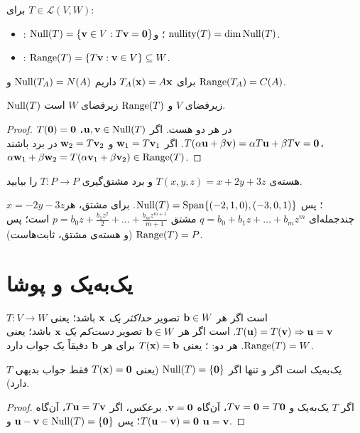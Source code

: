 \begin{definition}
برای $T\in\mathcal{L}(V,W)$:
\begin{itemize}
  \item {}: $\operatorname{Null}(T)=\{\mathbf{v}\in V: T\mathbf{v}=\mathbf{0}\}$؛ و $\operatorname{nullity}(T)=\dim\operatorname{Null}(T)$.
  \item {}: $\operatorname{Range}(T)=\{T\mathbf{v}:\mathbf{v}\in V\}\subseteq W$.
\end{itemize} برای $T_A(\mathbf{x})=A\mathbf{x}$ داریم $\operatorname{Null}(T_A)=N(A)$ و $\operatorname{Range}(T_A)=C(A)$.
\end{definition}

\begin{theorem}\label{thm:null-range-subspace}
$\operatorname{Null}(T)$ زیرفضای $V$ و $\operatorname{Range}(T)$ زیرفضای $W$ است.
\end{theorem}
\begin{proof}
$T(\mathbf{0})=\mathbf{0}$ در هر دو هست. اگر $\mathbf{u},\mathbf{v}\in\operatorname{Null}(T)$، $T(\alpha\mathbf{u}+\beta\mathbf{v})=\alpha T\mathbf{u}+\beta T\mathbf{v}=\mathbf{0}$. اگر $\mathbf{w}_1=T\mathbf{v}_1$ و $\mathbf{w}_2=T\mathbf{v}_2$ در برد باشند، $\alpha\mathbf{w}_1+\beta\mathbf{w}_2=T(\alpha\mathbf{v}_1+\beta\mathbf{v}_2)\in\operatorname{Range}(T)$.
\end{proof}

\begin{example}
هسته‌ی $T(x,y,z)=x+2y+3z$ و برد مشتق‌گیری $T:P\to P$ را بیابید.
\end{example}
\begin{solution}
$x=-2y-3z$؛ پس $\operatorname{Null}(T)=\operatorname{Span}\{(-2,1,0),(-3,0,1)\}$. برای مشتق، هر چندجمله‌ای $q=b_0+b_1z+\dots+b_mz^m$ مشتق $p=b_0z+\frac{b_1z^2}2+\dots+\frac{b_mz^{m+1}}{m+1}$ است؛ پس $\operatorname{Range}(T)=P$ (و هسته‌ی مشتق، ثابت‌هاست).
\end{solution}

\section{یک‌به‌یک و پوشا}

\begin{definition}[یک‌به‌یک و پوشا]
$T:V\to W$  است اگر هر $\mathbf{b}\in W$ تصویر \emph{حداکثر یک} $\mathbf{x}$ باشد؛ یعنی $T(\mathbf{u})=T(\mathbf{v})\Rightarrow\mathbf{u}=\mathbf{v}$.  است اگر هر $\mathbf{b}\in W$ تصویر \emph{دست‌کم یک} $\mathbf{x}$ باشد؛ یعنی $\operatorname{Range}(T)=W$. هر دو: ؛ یعنی $T(\mathbf{x})=\mathbf{b}$ برای هر $\mathbf{b}$ دقیقاً یک جواب دارد.
\end{definition}

\begin{theorem}\label{thm:injective-null}
$T$ یک‌به‌یک است اگر و تنها اگر $\operatorname{Null}(T)=\{\mathbf{0}\}$ (یعنی $T(\mathbf{x})=\mathbf{0}$ فقط جواب بدیهی دارد).
\end{theorem}
\begin{proof}
اگر $T$ یک‌به‌یک و $T\mathbf{v}=\mathbf{0}=T\mathbf{0}$، آن‌گاه $\mathbf{v}=\mathbf{0}$. برعکس، اگر $T\mathbf{u}=T\mathbf{v}$، آن‌گاه $T(\mathbf{u}-\mathbf{v})=\mathbf{0}$؛ پس $\mathbf{u}-\mathbf{v}\in\operatorname{Null}(T)=\{\mathbf{0}\}$ و $\mathbf{u}=\mathbf{v}$.
\end{proof}

